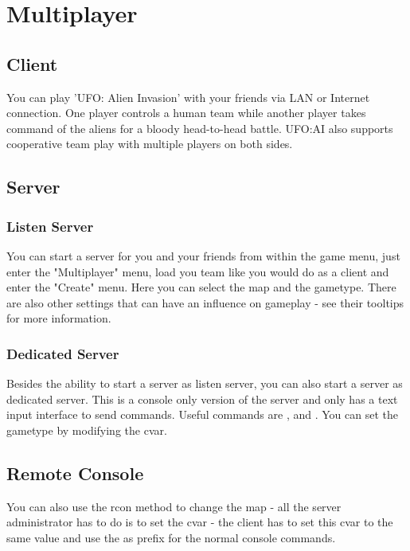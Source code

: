 \section{Multiplayer}
\subsection{Client}
You can play 'UFO: Alien Invasion' with your friends via LAN or Internet connection. One player controls a human team while another player takes command of the aliens for a bloody head-to-head battle. UFO:AI also supports cooperative team play with multiple players on both sides.
\subsection{Server}
\subsubsection{Listen Server}
You can start a server for you and your friends from within the game menu, just enter the "Multiplayer" menu, load you team like you would do as a client and enter the "Create" menu. Here you can select the map and the gametype. There are also other settings that can have an influence on gameplay - see their tooltips for more information.

\subsubsection{Dedicated Server}
Besides the ability to start a server as listen server, you can also start a server as dedicated server. This is a console only version of the server and only has a text input interface to send commands. Useful commands are ,  and . You can set the gametype by modifying the  cvar.

\subsection{Remote Console}
You can also use the rcon method to change the map - all the server administrator has to do is to set the cvar  - the client has to set this cvar to the same value and use the  as prefix for the normal console commands.


